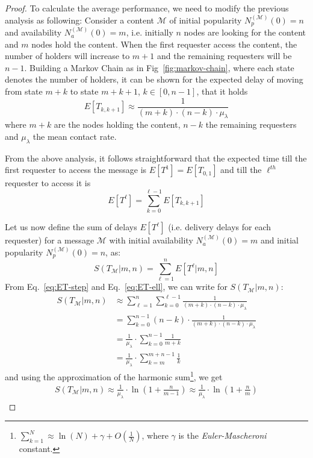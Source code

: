 \documentclass[journal]{IEEEtran}
\newcommand{\eq}[1]{Eq.~\eqref{#1}}
\newcommand{\Np}{N_{p}^{(\mathcal{M})}}
\newcommand{\Na}{N_{a}^{(\mathcal{M})}}
\begin{document}
\begin{proof}
To calculate the average performance, we need to modify the previous analysis as following: Consider a content $\mathcal{M}$ of initial popularity $\Np(0)=n$ and availability $\Na(0)=m$, i.e. initially $n$ nodes are looking for the content and $m$ nodes hold the content. When the first requester access the content, the number of holders will increase to $m+1$ and the remaining requesters will be $n-1$. Building a Markov Chain as in Fig~\ref{fig:markov-chain}, where each state denotes the number of holders, it can be shown for the expected delay of moving from state $m+k$ to state $m+k+1$, $k\in[0,n-1]$, that it holds
\begin{equation}\label{eq:ET-step}
E[T_{k,k+1}] \approx \frac{1}{(m+k)\cdot (n-k)\cdot \mu_{\lambda}} 
\end{equation}
where $m+k$ are the nodes holding the content, $n-k$ the remaining requesters and $\mu_{\lambda}$ the mean contact rate.

From the above analysis, it follows straightforward that the expected time till the first requester to access the message is $E[T^{1}]=E[T_{0,1}]$ and till the $\ell^{th}$ requester to access it is 
\begin{equation}\label{eq:ET-ell}
E[T^{\ell}]=\sum_{k=0}^{\ell-1}E[T_{k,k+1}]
\end{equation}

Let us now define the sum of delays $E[T^{\ell}]$ (i.e. delivery delays for each requester) for a message $\mathcal{M}$ with initial availability $\Na(0)=m$ and initial popularity $\Np(0)=n$, as:
\begin{equation} 
S(T_{\mathcal{M}}|m,n)= \sum_{\ell=1}^{n} E[T^{\ell}|m,n]
\end{equation}
From \eq{eq:ET-step} and \eq{eq:ET-ell}, we can write for $S(T_{\mathcal{M}}|m,n)$:
\begin{align}
S(T_{\mathcal{M}}|m,n)
&\approx  \sum_{\ell=1}^{n}\sum_{k=0}^{\ell-1}\frac{1}{(m+k)\cdot (n-k)\cdot \mu_{\lambda}} \nonumber\\
& =\sum_{k=0}^{n-1}(n-k)\cdot \frac{1}{(m+k)\cdot (n-k)\cdot \mu_{\lambda}} \nonumber\\
& =\frac{1}{ \mu_{\lambda}}\cdot\sum_{k=0}^{n-1}\frac{1}{m+k} \nonumber\\
& =\frac{1}{ \mu_{\lambda}}\cdot\sum_{k=m}^{m+n-1}\frac{1}{k}
\end{align}
and using the approximation of the harmonic sum\footnote{$\sum_{k=1}^{N}\approx \ln(N)+\gamma +O\left(\frac{1}{N}\right)$, where $\gamma$ is the \textit{Euler-Mascheroni} constant.}, we get
\begin{align}\label{eq:Sum-Tm-m,n}
S(T_{\mathcal{M}}|m,n)\approx \frac{1}{ \mu_{\lambda}}\cdot \ln\left(1+\frac{n}{m-1}\right)\approx \frac{1}{ \mu_{\lambda}}\cdot \ln\left(1+\frac{n}{m}\right)
\end{align}


\end{proof}
\end{document}
